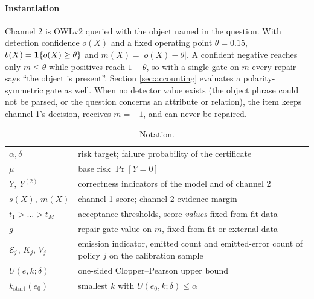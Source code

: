 \paragraph{Instantiation}
Channel 2 is OWLv2 \citep{owlv2} queried with the object named in the question. With detection
confidence $o(X)$ and a fixed operating point $\theta=0.15$, $b(X)=\mathbf{1}\{o(X)\ge\theta\}$ and
$m(X)=|o(X)-\theta|$. A confident negative reaches only $m\le\theta$ while positives reach
$1-\theta$, so with a single gate on $m$ every repair says ``the object is present''. Section
\ref{sec:accounting} evaluates a polarity-symmetric gate as well. When no detector value exists
(the object phrase could not be parsed, or the question concerns an attribute or relation), the
item keeps channel 1's decision, receives $m=-1$, and can never be repaired.

\begin{table}[t]
\centering
\caption{Notation.}
\label{tab:notation}
\small
\begin{tabular}{@{}lp{}@{}}
\toprule
$\alpha,\delta$ & risk target; failure probability of the certificate\\
$\mu$ & base risk $\Pr[Y=0]$\\
$Y,\ Y^{(2)}$ & correctness indicators of the model and of channel 2\\
$s(X),\ m(X)$ & channel-1 score; channel-2 evidence margin\\
$t_1>\dots>t_M$ & acceptance thresholds, score \emph{values} fixed from fit data\\
$g$ & repair-gate value on $m$, fixed from fit or external data\\
$\mathcal{E}_j$, $K_j$, $V_j$ & emission indicator, emitted count and emitted-error count of policy $j$ on the calibration sample\\
$U(e,k;\delta)$ & one-sided Clopper--Pearson upper bound\\
$k_{\mathrm{start}}(e_0)$ & smallest $k$ with $U(e_0,k;\delta)\le\alpha$\\
\bottomrule
\end{tabular}
\end{table}
